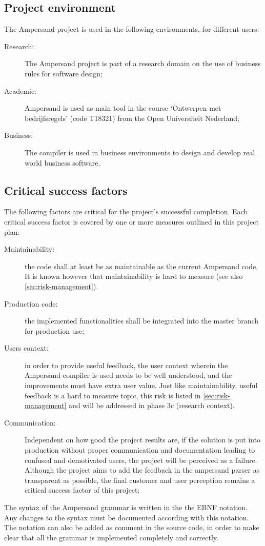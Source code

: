 \subsection{Project environment}
The Ampersand project is used in the following environments, for different users:
\begin{description}
	\item[Research:] The Ampersand project is part of a research domain on the use of business rules for software design;
	\item[Academic:] Ampersand is used as main tool in the course `Ontwerpen met bedrijfsregels' (code T18321) from the Open Universiteit Nederland;
	\item[Business:] The compiler is used in business environments to design and develop real world business software.
\end{description}

\subsection{Critical success factors}
\label{subsec:success-factors}
The following factors are critical for the project's successful completion.
Each critical success factor is covered by one or more measures outlined in this project plan:
\begin{description}
	\item[Maintainability:] the code shall at least be as maintainable as the current Ampersand code.
		It is known however that maintainability is hard to measure (see also \autoref{sec:risk-management}).
	\item[Production code:] the implemented functionalities shall be integrated into the master branch for production use;
	\item[Users context:] in order to provide useful feedback, the user context wherein the Ampersand compiler is used needs to be well understood, and the improvements must have extra user value. 
		Just like maintainability, useful feedback is a hard to measure topic, this risk is listed in \autoref{sec:risk-management} and will be addressed in phase 3c (research context).
	\item[Communication:] Independent on how good the project results are, if the solution is put into production without proper communication and documentation leading to confused and demotivated users, the project will be perceived as a failure. 
	Although the project aims to add the feedback in the ampersand parser as transparent as possible, the final customer and user perception remains a critical success factor of this project;
\end{description}
%
The syntax of the Ampersand grammar is written in the the EBNF notation.
Any changes to the syntax must be documented according with this notation.
The notation can also be added as comment in the source code, in order to make clear that all the grammar is implemented completely and correctly.

